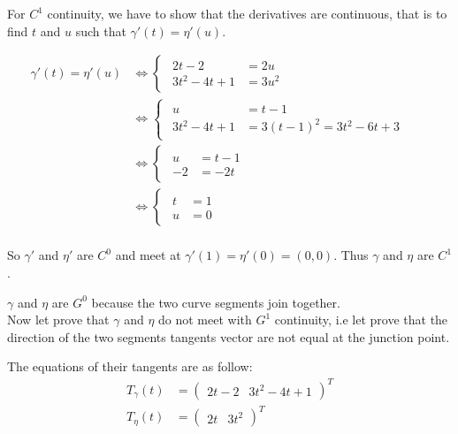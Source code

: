 \documentclass[a4paper,10pt]{article}
\begin{document}
\noindent
For $C^1$ continuity, we have to show that the derivatives are continuous, that is to find $t$ and $u$ such that $\gamma'(t) = \eta'(u)$.

\begin{equation}
\left.\begin{aligned}
\gamma'(t) = \eta'(u) &\iff
  \left\{\begin{array}{lr}
  	\left.\begin{aligned}
    2t - 2 &= 2u&\\
    3t^2 - 4t + 1 &= 3u^2&
    \end{aligned}\right.
  \end{array}\right.& \\
  &\iff
  \left\{\begin{array}{lr}
  	\left.\begin{aligned}
    u &= t - 1&\\
    3t^2 - 4t + 1 &= 3(t - 1)^2 = 3t^2 - 6t + 3&
    \end{aligned}\right.
  \end{array}\right.& \\
  &\iff
  \left\{\begin{array}{lr}
  	\left.\begin{aligned}
    u &= t - 1&\\
    -2 &= -2t &
    \end{aligned}\right.
  \end{array}\right.& \\
  &\iff
  \left\{\begin{array}{lr}
  	\left.\begin{aligned}
    t &= 1&\\
    u &= 0&
    \end{aligned}\right.
  \end{array}\right.& \\
\end{aligned}\right.
\end{equation}

\noindent
So $\gamma'$ and $\eta'$ are $C^0$ and meet at $\gamma'(1) = \eta'(0) = (0, 0)$. Thus $\gamma$ and $\eta$ are $C^1$.

\bigskip \noindent
$\gamma$ and $\eta$ are $G^0$ because the two curve segments join together. \\
Now let prove that $\gamma$ and $\eta$ do not meet with $G^1$ continuity, i.e let prove that the direction	 of the two segments tangents vector are not equal at the junction point.

\noindent
The equations of their tangents are as follow:
\begin{equation}
\left.\begin{aligned}
T_\gamma(t) &= \begin{pmatrix} 2t - 2 & 3t^2 - 4t + 1\end{pmatrix}^T \\
T_\eta(t) &= \begin{pmatrix} 2t & 3t^2\end{pmatrix}^T
\end{aligned}\right.
\end{equation}
\end{document}
